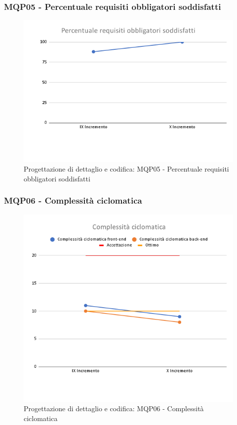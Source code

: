 \subsubsection{MQP05 - Percentuale requisiti obbligatori soddisfatti}
\begin{figure}[H]
    \centering
    \includegraphics[scale=0.50]{Sezioni/images/last_prodotto/Percentuale_requisiti_obbligatori_soddisfatti.png}
    \caption{Progettazione di dettaglio e codifica: MQP05 - Percentuale requisiti obbligatori soddisfatti}
\end{figure}
\subsubsection{MQP06 - Complessità ciclomatica}
\begin{figure}[H]
    \centering
    \includegraphics[scale=0.50]{Sezioni/images/last_prodotto/Complessita_ciclomatica.png}
    \caption{Progettazione di dettaglio e codifica: MQP06 - Complessità ciclomatica}
\end{figure}
